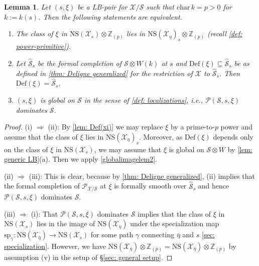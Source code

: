 \documentclass[letter, 11pt]{article}
\theoremstyle{plain}
\newtheorem{lemma}[subsubsection]{Lemma}
\theoremstyle{definition}
\newcommand{\IZ}{\mathbb{Z}}
\newcommand\tensor{{\otimes}}
\newcommand{\<}{\langle}
\renewcommand{\>}{\rangle}
\newcommand{\sX}{\mathcal{X}}
\newcommand{\sS}{\mathcal{S}}
\newcommand{\shP}{\mathscr{P}}
\newcommand{\Def}{\mathrm{Def}}
\newcommand{\NS}{\mathrm{NS}}
\begin{document}
\begin{lemma}
\label{lem: global LB def}
    Let $(s, \xi)$ be a LB-pair for $\sX/\sS$ such that $\mathrm{char\,} k = p > 0$ for $k := k(s)$. Then the following statements are equivalent. 
    \begin{enumerate}[label=\upshape{(\roman*)}]
        \item The class of $\xi$ in $\NS(\sX_s) \tensor \IZ_{(p)}$ lies in $\NS(\sX_\eta)_s \tensor \IZ_{(p)}$ (recall \ref{def: power-primitive}). 
        \item Let $\hat{\sS}_s$ be the formal completion of $\sS \tensor W(k)$ at $s$ and $\Def(\xi) \subseteq \hat{\sS}_s$ be as defined in \ref{thm: Deligne generalized} for the restriction of $\sX$ to $\hat{\sS}_s$. Then $\Def(\xi) = \hat{\sS}_s$. 
        \item $(s, \xi)$ is global on $\sS$ in the sense of \ref{def: localizations}, i.e., $\shP(\sS, s, \xi)$ dominates $\sS$. 
    \end{enumerate}
\end{lemma}
\begin{proof}
    (i) $\Rightarrow$ (ii): By \ref{lem: Def(xi)} we may replace $\xi$ by a prime-to-$p$ power and assume that the class of $\xi$ lies in $\NS(\sX_\eta)_s$. Moreover, as $\Def(\xi)$ depends only on the class of $\xi$ in $\NS(\sX_s)$, we may assume that $\xi$ is global on $\sS \tensor W$ by \ref{lem: generic LB}(a). Then we apply \ref{globalimagelem2}. 

    (ii) $\Rightarrow$ (iii): This is clear, because by \ref{thm: Deligne generalized}, (ii) implies that the formal completion of $\shP_{\sX/\sS}$ at $\xi$ is formally smooth over $\hat{\sS}_s$ and hence $\shP(\sS, s, \xi)$ dominates $\sS$. 

    (iii) $\Rightarrow$ (i): That $\shP(\sS, s, \xi)$ dominates $\sS$ implies that the class of $\xi$ in $\NS(\sX_s)$ lies in the image of $\NS(\sX_{\bar{\eta}})$ under the specialization map $\mathrm{sp}_\gamma : \NS(\sX_{\bar{\eta}}) \to \NS(\sX_s)$ for some path $\gamma$ connecting $\bar{\eta}$ and $s$ \ref{sec: specialization}. However, we have $\NS(\sX_\eta) \tensor \IZ_{(p)} = \NS(\sX_{\bar{\eta}}) \tensor \IZ_{(p)}$ by assumption (v) in the setup of \S\ref{sec: general setup}. 
\end{proof}
\end{document}
